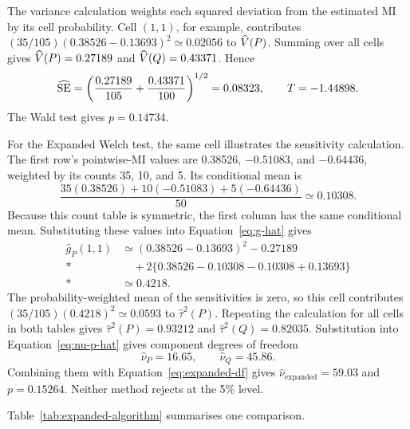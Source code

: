 The variance calculation weights each squared deviation from the estimated
MI by its cell probability. Cell \((1,1)\), for example, contributes
\((35/105)(0.38526-0.13693)^2\simeq0.02056\) to \(\widehat V(P)\).
Summing over all cells gives \(\widehat V(P)=0.27189\) and
\(\widehat V(Q)=0.43371\). Hence
\begin{equation}
  \widehat{\operatorname{SE}}
  =\left(\frac{0.27189}{105}+\frac{0.43371}{100}\right)^{1/2}
  =0.08323,
  \qquad
  T=-1.44898.
\end{equation}
The Wald test gives \(p=0.14734\).

For the Expanded Welch test, the same cell illustrates the sensitivity calculation.
The first row's pointwise-MI values are 0.38526, \(-0.51083\), and
\(-0.64436\), weighted by its counts 35, 10, and 5. Its conditional mean is
\begin{equation*}
 \frac{35(0.38526)+10(-0.51083)+5(-0.64436)}{50}
 \simeq0.10308.
\end{equation*}
Because this count table is symmetric, the first column has the same
conditional mean. Substituting these values into Equation~\eqref{eq:g-hat} gives
\begin{align*}
 \widehat g_P(1,1)
 &\simeq (0.38526-0.13693)^2-0.27189\\*
 &\quad+2\{0.38526-0.10308-0.10308+0.13693\}\\*
 &\simeq0.4218.
\end{align*}
The probability-weighted mean of the sensitivities is zero, so this cell
contributes \((35/105)(0.4218)^2\simeq0.0593\) to
\(\widehat\tau^2(P)\). Repeating the calculation for all cells in both
tables gives \(\widehat\tau^2(P)=0.93212\) and
\(\widehat\tau^2(Q)=0.82035\). Substitution into
Equation~\eqref{eq:nu-p-hat} gives component degrees of freedom
\begin{equation}
  \widehat\nu_P=16.65,
  \qquad
  \widehat\nu_Q=45.86.
\end{equation}
Combining them with Equation~\eqref{eq:expanded-df} gives
\(\widehat\nu_{\mathrm{expanded}}=59.03\) and \(p=0.15264\).
Neither method rejects at the 5\% level.

\pagebreak[3]
\medskip
{}
\label{sec:expanded-complexity}

Table~\ref{tab:expanded-algorithm} summarises one comparison.

